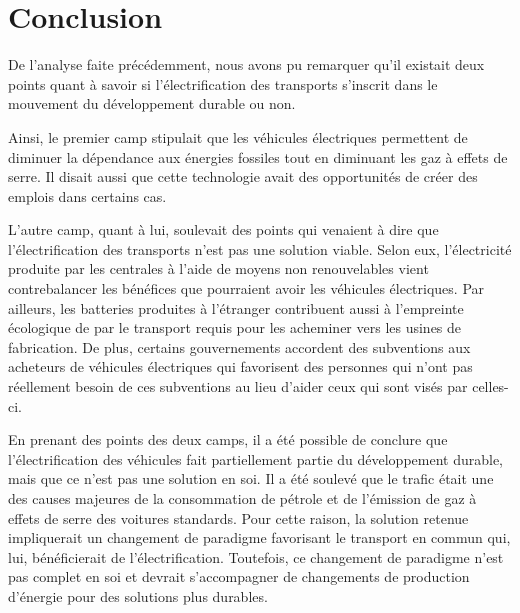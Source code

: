 
\chapter{Conclusion}

De l'analyse faite précédemment, nous avons pu remarquer qu'il existait deux points quant à savoir si l'électrification des transports s'inscrit dans le mouvement du développement durable ou non. 

Ainsi, le premier camp stipulait que les véhicules électriques permettent de diminuer la dépendance aux énergies fossiles tout en diminuant les gaz à effets de serre.
Il disait aussi que cette technologie avait des opportunités de créer des emplois dans certains cas.

L'autre camp, quant à lui, soulevait des points qui venaient à dire que l'électrification des transports n'est pas une solution viable. Selon eux, l'électricité produite par les centrales à l'aide de moyens non renouvelables vient contrebalancer les bénéfices que pourraient avoir les véhicules électriques. Par ailleurs, les batteries produites à l'étranger contribuent aussi à l'empreinte écologique de par le transport requis pour les acheminer vers les usines de fabrication. De plus, certains gouvernements accordent des subventions aux acheteurs de véhicules électriques qui favorisent des personnes qui n'ont pas réellement besoin de ces subventions au lieu d'aider ceux qui sont visés par celles-ci.

En prenant des points des deux camps, il a été possible de conclure que l'électrification des véhicules fait partiellement partie du développement durable, mais que ce n'est pas une solution en soi. Il a été soulevé que le trafic était une des causes majeures de la consommation de pétrole et de l'émission de gaz à effets de serre des voitures standards. Pour cette raison, la solution retenue impliquerait un changement de paradigme favorisant le transport en commun qui, lui, bénéficierait de l'électrification. Toutefois, ce changement de paradigme n'est pas complet en soi et devrait s'accompagner de changements de production d'énergie pour des solutions plus durables.

